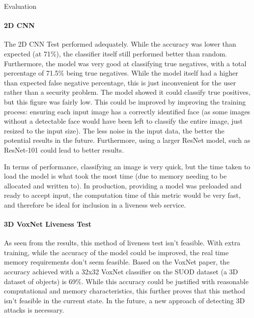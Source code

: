 \documentclass[final]{beamer}
\begin{document}
\begin{frame}{}
\begin{columns}[t]
\begin{column}{.48\linewidth}
\begin{block}{Evaluation}
      \paragraph{2D CNN}
          The 2D CNN Test performed adequately. While the accuracy was lower than expected (at 71\%), the classifier itself still performed better than random.
          Furthermore, the model was very good at classifying true negatives, with a total percentage of 71.5\% being true negatives. While the model itself had
          a higher than expected false negative percentage, this is just inconvenient for the user rather than a security problem. The model showed it could classify true
          positives, but this figure was fairly low. This could be improved by improving the training process: ensuring each input image has a correctly identified face (as
          some images without a detectable face would have been left to classify the entire image, just resized to the input size). The less noise in the input data, the better the potential
          results in the future. Furthermore, using a larger ResNet model, such as ResNet-101 could lead to better results.

          In terms of performance, classifying an image is very quick, but the time taken to load the model is what took the most time (due to memory needing to be allocated and written to).
          In production, providing a model was preloaded and ready to accept input, the computation time of this metric would be very fast, and therefore be ideal for inclusion in a liveness web service.
      \paragraph{3D VoxNet Liveness Test}
          As seen from the results, this method of liveness test isn't feasible. With extra training, while the accuracy of the model could be improved, the
          real time memory requirements don't seem feasible. Based on the VoxNet paper, the accuracy achieved with a 32x32 VoxNet classifier on the SUOD dataset (a 3D dataset of objects)
          is 69\%. While this accuracy could be justified with reasonable computational and memory characteristics, this further proves that this method isn't feasible in the current state. In the future, a new approach of detecting 3D attacks is necessary.

        \end{block}
        

\end{column}
\end{columns}
\end{frame}
\end{document}

